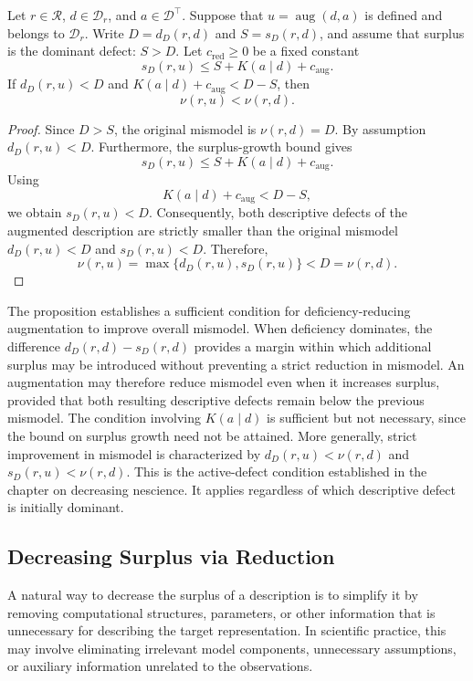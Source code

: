 \begin{proposition}
\label{prop:augmentation_decreases_mismodel}
Let $r\in\mathcal R$, $d\in\mathcal D_r$, and $a\in\mathcal D^\top$. Suppose that $u=\operatorname{aug}(d,a)$ is defined and belongs to $\mathcal D_r$. Write $D=d_D(r,d)$ and $S=s_D(r,d)$, and assume that surplus is the dominant defect: $S>D$. Let $c_{\operatorname{red}}\geq 0$ be a fixed constant
\[
s_D(r,u) \le S+K(a\mid d)+c_{\operatorname{aug}}.
\]
If $d_D(r,u)<D$ and $K(a\mid d)+c_{\operatorname{aug}}<D-S$, then
\[
\nu(r,u)<\nu(r,d).
\]
\end{proposition}
\begin{proof}
Since $D>S$, the original mismodel is $\nu(r,d) = D$. By assumption $d_D(r,u) < D$. Furthermore, the surplus-growth bound gives
\[
s_D(r,u) \le S+K(a\mid d)+c_{\operatorname{aug}}.
\]
Using
\[
K(a\mid d)+c_{\operatorname{aug}}<D-S,
\]
we obtain $s_D(r,u)<D$. Consequently, both descriptive defects of the augmented description are strictly smaller than the original mismodel $d_D(r,u)<D$ and $s_D(r,u)<D$. Therefore,
\[
\nu(r,u) = \max\{d_D(r,u),s_D(r,u)\} < D =\nu(r,d).
\]
\end{proof}

The proposition establishes a sufficient condition for deficiency-reducing augmentation to improve overall mismodel. When deficiency dominates, the difference $d_D(r,d)-s_D(r,d)$ provides a margin within which additional surplus may be introduced without preventing a strict reduction in mismodel. An augmentation may therefore reduce mismodel even when it increases surplus, provided that both resulting descriptive defects remain below the previous mismodel. The condition involving $K(a\mid d)$ is sufficient but not necessary, since the bound on surplus growth need not be attained. More generally, strict improvement in mismodel is characterized by $d_D(r,u)<\nu(r,d)$ and $s_D(r,u)<\nu(r,d)$. This is the active-defect condition established
in the chapter on decreasing nescience. It applies regardless of which descriptive defect is initially dominant.


\subsection*{Decreasing Surplus via Reduction}

A natural way to decrease the surplus of a description is to simplify it by removing computational structures, parameters, or other information that is unnecessary for describing the target representation. In scientific practice, this may involve eliminating irrelevant model components, unnecessary assumptions, or auxiliary information unrelated to the observations.

